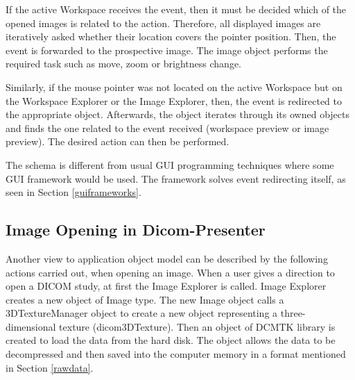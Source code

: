 If the active Workspace receives the event, then it must be decided which of the opened images is related to the action. Therefore, all displayed images are iteratively asked whether their location covers the pointer position. Then, the event is forwarded to the prospective image. The image object performs the required task such as move, zoom or brightness change.

Similarly, if the mouse pointer was not located on the active Workspace but on the Workspace Explorer or the Image Explorer, then, the event is redirected to the appropriate object. Afterwards, the object iterates through its owned objects and finds the one related to the event received (workspace preview or image preview). The desired action can then be performed.

The schema is different from usual GUI programming techniques where some GUI framework would be used. The framework solves event redirecting itself, as seen in Section \ref{guiframeworks}.

\subsection{Image Opening in Dicom-Presenter}

Another view to application object model can be described by the following actions carried out, when opening an image. When a user gives a direction to open a DICOM study, at first the Image Explorer is called. Image Explorer creates a new object of Image type. The new Image object calls a 3DTextureManager object to create a new object representing a three-dimensional texture (dicom3DTexture). Then an object of DCMTK library is created to load the data from the hard disk. The object allows the data to be decompressed and then saved into the computer memory in a format mentioned in Section \ref{rawdata}.

